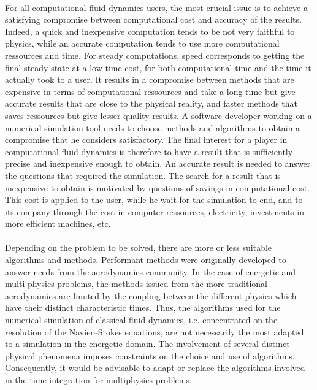     \paragraph{}
    For all computational fluid dynamics users, the most crucial issue is to achieve a satisfying compromise between computational cost and accuracy of the results.
    Indeed, a quick and inexpensive computation tends to be not very faithful to physics, while an accurate computation tends to use more computational ressources and time.
    For steady computations, speed corresponds to getting the final steady state at a low time cost, for both computational time and the time it actually took to a user.
    It results in a compromise between methods that are expensive in terms of computational ressources and take a long time but give accurate results that are close to the physical reality, and faster methods that saves ressources but give lesser quality results.
    A software developer working on a numerical simulation tool needs to choose methods and algorithms to obtain a compromise that he considers satisfactory.
    The final interest for a player in computational fluid dynamics is therefore to have a result that is sufficiently precise and inexpensive enough to obtain.
    An accurate result is needed to answer the questions that required the simulation.
    The search for a result that is inexpensive to obtain is motivated by questions of savings in computational cost.
    This cost is applied to the user, while he wait for the simulation to end, and to its company through the cost in computer ressources, electricity, investments in more efficient machines, etc.

    \paragraph{}
    Depending on the problem to be solved, there are more or less suitable algorithms and methods.
    Performant methods were originally developed to answer needs from the aerodynamics community.
    In the case of energetic and multi-physics problems, the methods issued from the more traditional aerodynamics are limited by the coupling  between the different physics which have their distinct characteristic times.
    Thus, the algorithms used for the numerical simulation of classical fluid dynamics, i.e. concentrated on the resolution of the Navier--Stokes equations, are not necessarily the most adapted to a simulation in the energetic domain.
    The involvement of several distinct physical phenomena imposes constraints on the choice and use of algorithms.
    Consequently, it would be advisable to adapt or replace the algorithms involved in the time integration for multiphysics problems.


